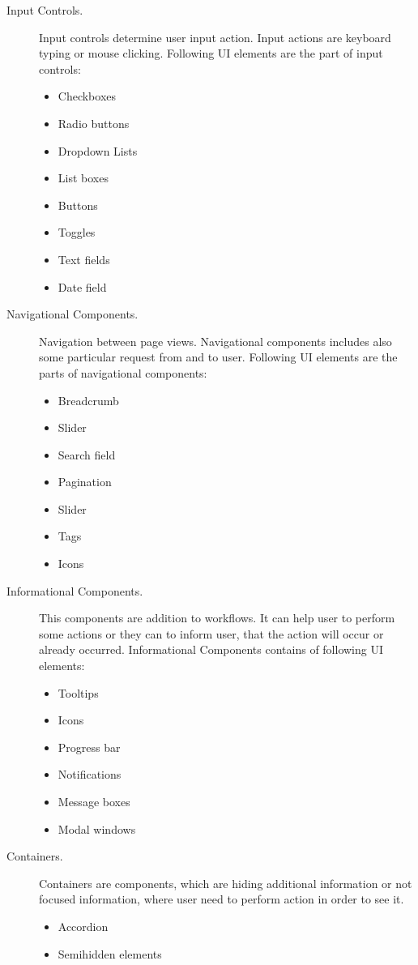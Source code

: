 \begin{description}
\item[Input Controls.] Input controls determine user input action. Input actions are keyboard typing or mouse clicking.  Following UI elements are the part of input controls: 
\begin{itemize}
\item Checkboxes
\item Radio buttons 
\item Dropdown Lists
\item List boxes
\item Buttons
\item Toggles
\item Text fields
\item Date field
\end{itemize}
\item[Navigational Components.] Navigation between page views. Navigational components includes also some particular request from and to user. Following UI elements are the parts of navigational components:
\begin{itemize}
\item Breadcrumb 
\item Slider
\item Search field
\item Pagination
\item Slider
\item Tags
\item Icons
\end{itemize}
\item[Informational Components.] This components are addition to workflows. It can help user to perform some actions or they can to inform user, that the action will occur or already occurred. Informational Components contains of following UI elements:
\begin{itemize}
\item Tooltips
\item Icons
\item Progress bar
\item Notifications
\item Message boxes
\item Modal windows
\end{itemize}
\item[Containers.] Containers are components, which are hiding additional information or not focused information, where user need to perform action in order to see it.   
\begin{itemize}
\item Accordion
\item Semihidden elements
\end{itemize}
\end{description}

